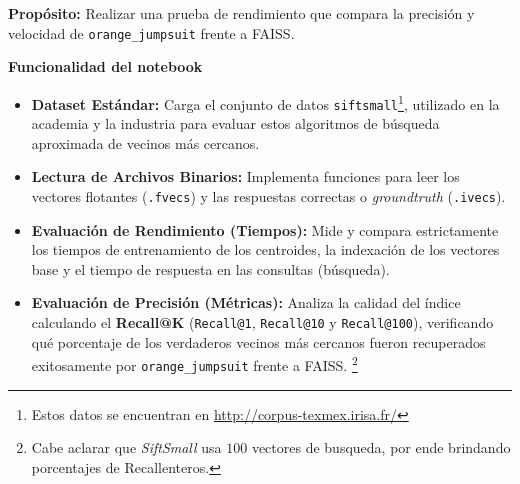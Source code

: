 \textbf{Prop\'osito:} 
Realizar una prueba de rendimiento que compara la precisi\'on y velocidad de 
\texttt{orange\_jumpsuit} frente a FAISS.

\textbf{Funcionalidad del notebook}
\begin{itemize}
    \item \textbf{Dataset Est\'andar:}
      Carga el conjunto de datos \texttt{siftsmall}\footnote{
      Estos datos se encuentran en \url{http://corpus-texmex.irisa.fr/}}, 
      utilizado en la academia y la industria para evaluar estos algoritmos de
      b\'usqueda aproximada de vecinos m\'as cercanos.
    \item \textbf{Lectura de Archivos Binarios:} 
      Implementa funciones para leer los vectores flotantes (\texttt{.fvecs})
      y las respuestas correctas o \textit{groundtruth} (\texttt{.ivecs}).
    \item \textbf{Evaluaci\'on de Rendimiento (Tiempos):}
      Mide y compara estrictamente los tiempos de entrenamiento de los 
      centroides, la indexaci\'on de los vectores base y el tiempo de respuesta
      en las consultas (b\'usqueda).
    \item \textbf{Evaluaci\'on de Precisi\'on (M\'etricas):} 
      Analiza la calidad del \'indice calculando el \textbf{Recall@K} 
      (\texttt{Recall@1}, \texttt{Recall@10} y \texttt{Recall@100}),
      verificando qu\'e porcentaje de los verdaderos vecinos m\'as cercanos
      fueron recuperados exitosamente por \texttt{orange\_jumpsuit} frente a 
      FAISS. \footnote{
      Cabe aclarar que \textit{SiftSmall} usa $100$ vectores de busqueda,
      por ende brindando porcentajes de Recall\@n enteros.}
\end{itemize}


